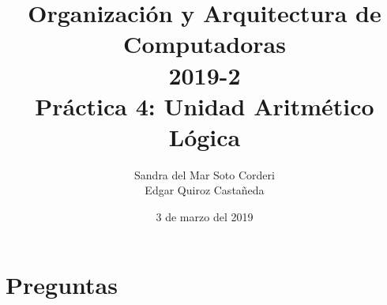 \documentclass{article}
\begin{document}
    \title{
        Organización y Arquitectura de Computadoras \\
        2019-2 \\
        Práctica 4: Unidad Aritmético Lógica
    }
    \author{
        Sandra del Mar Soto Corderi \\
        Edgar Quiroz Castañeda
    }
    \date{
        3 de marzo del 2019
    }

    \maketitle

    \section{Preguntas}
\end{document}
